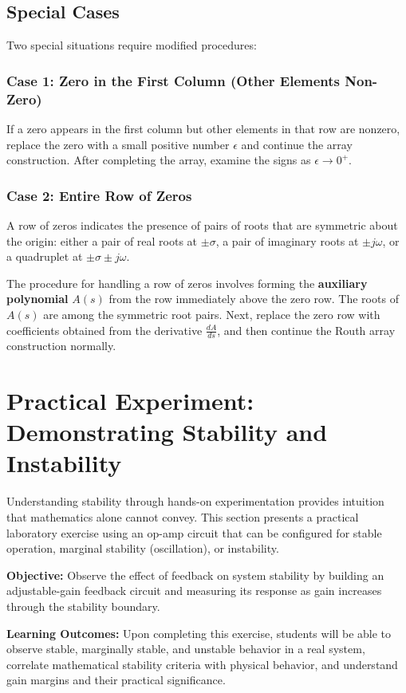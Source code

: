\subsection{Special Cases}

Two special situations require modified procedures:

\subsubsection{Case 1: Zero in the First Column (Other Elements Non-Zero)}

If a zero appears in the first column but other elements in that row are nonzero, replace the zero with a small positive number $\epsilon$ and continue the array construction. After completing the array, examine the signs as $\epsilon \to 0^+$.

\subsubsection{Case 2: Entire Row of Zeros}

A row of zeros indicates the presence of pairs of roots that are symmetric about the origin: either a pair of real roots at $\pm\sigma$, a pair of imaginary roots at $\pm j\omega$, or a quadruplet at $\pm\sigma \pm j\omega$.

The procedure for handling a row of zeros involves forming the \textbf{auxiliary polynomial} $A(s)$ from the row immediately above the zero row. The roots of $A(s)$ are among the symmetric root pairs. Next, replace the zero row with coefficients obtained from the derivative $\frac{dA}{ds}$, and then continue the Routh array construction normally.

\section{Practical Experiment: Demonstrating Stability and Instability}
\label{sec:experiment}

Understanding stability through hands-on experimentation provides intuition that mathematics alone cannot convey. This section presents a practical laboratory exercise using an op-amp circuit that can be configured for stable operation, marginal stability (oscillation), or instability.

\begin{experimentbox}
\textbf{Objective:} Observe the effect of feedback on system stability by building an adjustable-gain feedback circuit and measuring its response as gain increases through the stability boundary.

\textbf{Learning Outcomes:} Upon completing this exercise, students will be able to observe stable, marginally stable, and unstable behavior in a real system, correlate mathematical stability criteria with physical behavior, and understand gain margins and their practical significance.
\end{experimentbox}

